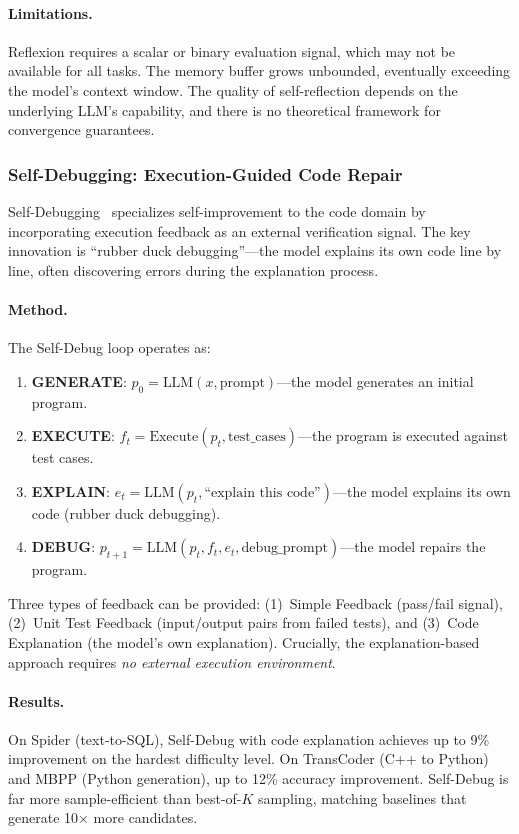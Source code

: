 \paragraph{Limitations.}
Reflexion requires a scalar or binary evaluation signal, which may not be available for all tasks. The memory buffer grows unbounded, eventually exceeding the model's context window. The quality of self-reflection depends on the underlying LLM's capability, and there is no theoretical framework for convergence guarantees.

\subsubsection{Self-Debugging: Execution-Guided Code Repair}
\label{sec:self-debug}

Self-Debugging~\citep{chen2023selfdebug} specializes self-improvement to the code domain by incorporating execution feedback as an external verification signal. The key innovation is ``rubber duck debugging''---the model explains its own code line by line, often discovering errors during the explanation process.

\paragraph{Method.}
The Self-Debug loop operates as:

\begin{enumerate}
    \item \textbf{GENERATE}: $p_0 = \text{LLM}(x, \text{prompt})$---the model generates an initial program.
    \item \textbf{EXECUTE}: $f_t = \text{Execute}(p_t, \text{test\_cases})$---the program is executed against test cases.
    \item \textbf{EXPLAIN}: $e_t = \text{LLM}(p_t, \text{``explain this code''})$---the model explains its own code (rubber duck debugging).
    \item \textbf{DEBUG}: $p_{t+1} = \text{LLM}(p_t, f_t, e_t, \text{debug\_prompt})$---the model repairs the program.
\end{enumerate}

Three types of feedback can be provided: (1)~Simple Feedback (pass/fail signal), (2)~Unit Test Feedback (input/output pairs from failed tests), and (3)~Code Explanation (the model's own explanation). Crucially, the explanation-based approach requires \emph{no external execution environment}.

\paragraph{Results.}
On Spider (text-to-SQL), Self-Debug with code explanation achieves up to 9\% improvement on the hardest difficulty level. On TransCoder (C++ to Python) and MBPP (Python generation), up to 12\% accuracy improvement. Self-Debug is far more sample-efficient than best-of-$K$ sampling, matching baselines that generate 10$\times$ more candidates.

